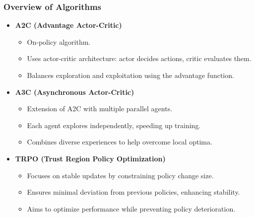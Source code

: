 \documentclass{beamer}
\begin{document}
\begin{frame}[fragile]
    \frametitle{Overview of Algorithms}
    \begin{itemize}
        \item \textbf{A2C (Advantage Actor-Critic)}
        \begin{itemize}
            \item On-policy algorithm.
            \item Uses actor-critic architecture: actor decides actions, critic evaluates them.
            \item Balances exploration and exploitation using the advantage function.
        \end{itemize}

        \item \textbf{A3C (Asynchronous Actor-Critic)}
        \begin{itemize}
            \item Extension of A2C with multiple parallel agents.
            \item Each agent explores independently, speeding up training.
            \item Combines diverse experiences to help overcome local optima.
        \end{itemize}

        \item \textbf{TRPO (Trust Region Policy Optimization)}
        \begin{itemize}
            \item Focuses on stable updates by constraining policy change size.
            \item Ensures minimal deviation from previous policies, enhancing stability.
            \item Aims to optimize performance while preventing policy deterioration.
        \end{itemize}
    \end{itemize}
\end{frame}
\end{document}
